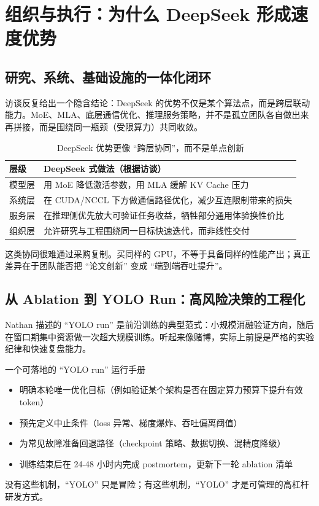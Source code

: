\section{组织与执行：为什么 DeepSeek 形成速度优势}

\subsection{研究、系统、基础设施的一体化闭环}

访谈反复给出一个隐含结论：DeepSeek 的优势不仅是某个算法点，而是跨层联动能力。MoE、MLA、底层通信优化、推理服务策略，并不是孤立团队各自做出来再拼接，而是围绕同一瓶颈（受限算力）共同收敛。

\begin{table}[H]
\centering
\begin{tabular}{lp{8.5cm}}
\toprule
\textbf{层级} & \textbf{DeepSeek 式做法（根据访谈）} \\
\midrule
模型层 & 用 MoE 降低激活参数，用 MLA 缓解 KV Cache 压力 \\
系统层 & 在 CUDA/NCCL 下方做通信路径优化，减少互连限制带来的损失 \\
服务层 & 在推理侧优先放大可验证任务收益，牺牲部分通用体验换性价比 \\
组织层 & 允许研究与工程围绕同一目标快速迭代，而非线性交付 \\
\bottomrule
\end{tabular}
\caption{DeepSeek 优势更像 ``跨层协同''，而不是单点创新}
\end{table}

这类协同很难通过采购复制。买同样的 GPU，不等于具备同样的性能产出；真正差异在于团队能否把 ``论文创新'' 变成 ``端到端吞吐提升''。

\subsection{从 Ablation 到 YOLO Run：高风险决策的工程化}

Nathan 描述的 ``YOLO run'' 是前沿训练的典型范式：小规模消融验证方向，随后在窗口期集中资源做一次超大规模训练。听起来像赌博，实际上前提是严格的实验纪律和快速复盘能力。

\begin{knowledgebox}{一个可落地的 ``YOLO run'' 运行手册}
\begin{itemize}
    \item 明确本轮唯一优化目标（例如验证某个架构是否在固定算力预算下提升有效 token）
    \item 预先定义中止条件（loss 异常、梯度爆炸、吞吐偏离阈值）
    \item 为常见故障准备回退路径（checkpoint 策略、数据切换、混精度降级）
    \item 训练结束后在 24-48 小时内完成 postmortem，更新下一轮 ablation 清单
\end{itemize}

没有这些机制，``YOLO'' 只是冒险；有这些机制，``YOLO'' 才是可管理的高杠杆研发方式。
\end{knowledgebox}

